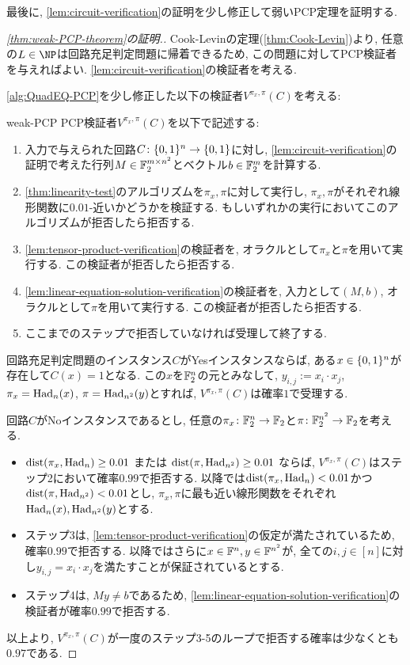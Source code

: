   最後に, \cref{lem:circuit-verification}の証明を少し修正して弱いPCP定理を証明する.
  \begin{proof}[\cref{thm:weak-PCP-theorem}の証明.]
    Cook-Levinの定理(\cref{thm:Cook-Levin})より, 任意の$L\in\NP$は回路充足判定問題に帰着できるため, この問題に対してPCP検証者を与えればよい.
    \cref{lem:circuit-verification}の検証者を考える.

    \cref{alg:QuadEQ-PCP}を少し修正した以下の検証者$V^{\pi_x,\pi}(C)$を考える:
    \begin{algo}{}{weak-PCP}
      PCP検証者$V^{\pi_x,\pi}(C)$を以下で記述する:
      \begin{enumerate}
        \item 入力で与えられた回路$C\colon\{0,1\}^n\to\{0,1\}$に対し, \cref{lem:circuit-verification}の証明で考えた行列$M\in\mathbb{F}_2^{m\times n^2}$とベクトル$b\in\mathbb{F}_2^m$を計算する.
        \item \cref{thm:linearity-test}のアルゴリズムを$\pi_x,\pi$に対して実行し, $\pi_x,\pi$がそれぞれ線形関数に$0.01$-近いかどうかを検証する. もしいずれかの実行においてこのアルゴリズムが拒否したら拒否する.
        \item \cref{lem:tensor-product-verification}の検証者を, オラクルとして$\pi_x$と$\pi$を用いて実行する. この検証者が拒否したら拒否する.
        \item \cref{lem:linear-equation-solution-verification}の検証者を, 入力として$(M,b)$, オラクルとして$\pi$を用いて実行する. この検証者が拒否したら拒否する.
        \item ここまでのステップで拒否していなければ受理して終了する.
      \end{enumerate}
    \end{algo}

    回路充足判定問題のインスタンス$C$がYesインスタンスならば, ある$x\in\{0,1\}^n$が存在して$C(x)=1$となる. この$x$を$\mathbb{F}_2^n$の元とみなして, $y_{i,j}:=x_i\cdot x_j$, $\pi_x = \mathrm{Had}_n(x)$, $\pi = \mathrm{Had}_{n^2}(y)$とすれば,
    $V^{\pi_x,\pi}(C)$は確率$1$で受理する.

    回路$C$がNoインスタンスであるとし, 任意の$\pi_x\colon \mathbb{F}_2^n\to\mathbb{F}_2$と$\pi\colon \mathbb{F}_2^{n^2}\to\mathbb{F}_2$を考える.
    \begin{itemize}
      \item $\mathrm{dist}(\pi_x,\mathrm{Had}_n)\ge 0.01$ または $\mathrm{dist}(\pi,\mathrm{Had}_{n^2})\ge 0.01$ ならば, $V^{\pi_x,\pi}(C)$はステップ2において確率$0.99$で拒否する. 以降では$\mathrm{dist}(\pi_x,\mathrm{Had}_n) < 0.01$かつ$\mathrm{dist}(\pi,\mathrm{Had}_{n^2}) < 0.01$とし, $\pi_x,\pi$に最も近い線形関数をそれぞれ$\mathrm{Had}_n(x),\mathrm{Had}_{n^2}(y)$とする.
      \item ステップ3は, \cref{lem:tensor-product-verification}の仮定が満たされているため, 確率$0.99$で拒否する. 以降ではさらに$x\in\mathbb{F}^n,y\in\mathbb{F}^{n^2}$が, 全ての$i,j\in [n]$に対し$y_{i,j}=x_i\cdot x_j$を満たすことが保証されているとする.
      \item ステップ4は, $My\ne b$であるため, \cref{lem:linear-equation-solution-verification}の検証者が確率$0.99$で拒否する.
    \end{itemize}
    以上より, $V^{\pi_x,\pi}(C)$が一度のステップ3-5のループで拒否する確率は少なくとも$0.97$である.
  
  \end{proof}

